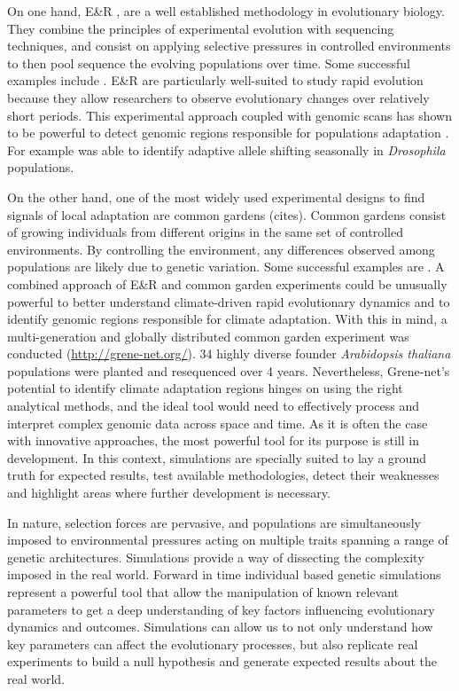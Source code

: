 \documentclass{article}
\begin{document}
On one hand, E\&R \citep{Schlotterer2015-yz}, are a well established methodology in evolutionary biology. They combine the principles of experimental evolution with sequencing techniques, and consist on applying selective pressures in controlled environments to then pool sequence the evolving populations over time. Some successful examples include \citep{Bergland2014-ud, Kapun2021-cd, Rudman2022-uc}. E\&R are particularly well-suited to study rapid evolution because they allow researchers to observe evolutionary changes over relatively short periods. This experimental approach coupled with genomic scans has shown to be powerful to detect genomic regions responsible for populations adaptation \citep{Vlachos2019-nf}. For example \citep{Bergland2014-ud} was able to identify adaptive allele shifting seasonally in \textit{Drosophila} populations. 

On the other hand, one of the most widely used experimental designs to find signals of local adaptation are common gardens (cites). Common gardens consist of growing individuals from different origins in the same set of controlled environments. By controlling the environment, any differences observed among populations are likely due to genetic variation. Some successful examples are \citep{Exposito-Alonso2019-hs, Lepais2014-za}. A combined approach of E\&R and common garden experiments could be unusually powerful to better understand climate-driven rapid evolutionary dynamics and to identify genomic regions responsible for climate adaptation. With this in mind, a multi-generation and globally distributed common garden experiment was conducted (\url{http://grene-net.org/}). 34 highly diverse founder \textit{Arabidopsis thaliana} populations were planted and resequenced over 4 years. Nevertheless, Grene-net's potential to identify climate adaptation regions hinges on using the right analytical methods, and the ideal tool would need to effectively process and interpret complex genomic data across space and time. As it is often the case with innovative approaches, the most powerful tool for its purpose is still in development. In this context, simulations are specially suited to lay a ground truth for expected results, test available methodologies, detect their weaknesses and highlight areas where further development is necessary.

In nature, selection forces are pervasive, and populations are simultaneously imposed to environmental pressures acting on multiple traits spanning a range of genetic architectures. Simulations provide a way of dissecting the complexity imposed in the real world. Forward in time individual based genetic simulations represent a powerful tool that allow the manipulation of known relevant parameters to get a deep understanding of key factors influencing evolutionary dynamics and outcomes. Simulations can allow us to not only understand how key parameters can affect the evolutionary processes, but also replicate real experiments to build a null hypothesis and generate expected results about the real world. 
\end{document}
